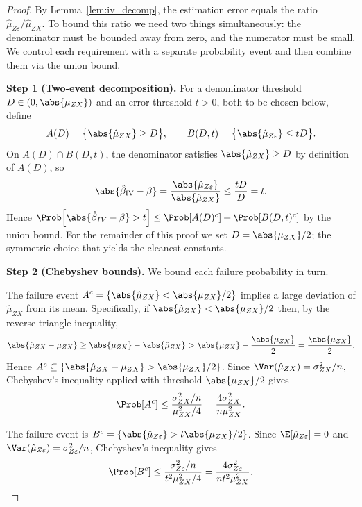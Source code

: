 \begin{proof}
    By Lemma~\ref{lem:iv_decomp}, the estimation error equals the ratio $\hat{\mu}_{Z\varepsilon}/\hat{\mu}_{ZX}$. To bound this ratio we need two things simultaneously: the denominator must be bounded away from zero, and the numerator must be small. We control each requirement with a separate probability event and then combine them via the union bound.

    \medskip\noindent\textbf{Step 1 (Two-event decomposition).}
    For a denominator threshold $D \in (0,\abs{\mu_{ZX}})$ and an error threshold $t > 0$, both to be chosen below, define
    \[
        A(D)   = \bigl\{\abs{\hat{\mu}_{ZX}} \geq D\bigr\},
        \qquad
        B(D,t) = \bigl\{\abs{\hat{\mu}_{Z\varepsilon}} \leq tD\bigr\}.
    \]
    On $A(D)\cap B(D,t)$, the denominator satisfies $\abs{\hat{\mu}_{ZX}}\geq D$ by definition of $A(D)$, so
    \[
        \abs{\hat{\beta}_{\mathrm{IV}} - \beta}= \frac{\abs{\hat{\mu}_{Z \varepsilon}}}{\abs{\hat{\mu}_{ZX}}} \leq \frac{tD}{D} = t.
    \]
    Hence $\Prob\!\left[\abs{\hat\beta_{IV}-\beta}>t\right] \leq \Prob[A(D)^c] + \Prob[B(D,t)^c]$ by the union bound. For the remainder of this proof we set $D = \abs{\mu_{ZX}}/2$; the symmetric choice that yields the cleanest constants.

    \medskip\noindent\textbf{Step 2 (Chebyshev bounds).}
    We bound each failure probability in turn.

    The failure event $A^c = \{\abs{\hat{\mu}_{ZX}} < \abs{\mu_{ZX}}/2\}$ implies a large deviation of $\hat{\mu}_{ZX}$ from its mean. Specifically, if $\abs{\hat{\mu}_{ZX}} < \abs{\mu_{ZX}}/2$ then, by the reverse triangle inequality,
    \[
        \abs{\hat{\mu}_{ZX} - \mu_{ZX}} \geq \abs{\mu_{ZX}} - \abs{\hat{\mu}_{ZX}} > \abs{\mu_{ZX}} - \frac{\abs{\mu_{ZX}}}{2} = \frac{\abs{\mu_{ZX}}}{2}.
    \]
    Hence $A^c \subseteq \{\abs{\hat{\mu}_{ZX}-\mu_{ZX}} > \abs{\mu_{ZX}}/2\}$. Since $\Var(\hat{\mu}_{ZX}) = \sigma_{ZX}^2/n$, Chebyshev's inequality applied with threshold $\abs{\mu_{ZX}}/2$ gives
    \[
        \Prob[A^c] \leq \frac{\sigma_{ZX}^2/n}{\mu_{ZX}^2/4} = \frac{4\sigma_{ZX}^2}{n\mu_{ZX}^2}.
    \]

    The failure event is $B^c = \{\abs{\hat{\mu}_{Z\varepsilon}} > t\abs{\mu_{ZX}}/2\}$. Since $\E[\hat{\mu}_{Z\varepsilon}] = 0$ and $\Var(\hat{\mu}_{Z\varepsilon}) = \sigma_{Z\varepsilon}^2/n$, Chebyshev's inequality gives
    \[
        \Prob[B^c] \leq \frac{\sigma_{Z\varepsilon}^2/n}{t^2\mu_{ZX}^2/4} = \frac{4\sigma_{Z\varepsilon}^2}{nt^2\mu_{ZX}^2}.
    \]


\end{proof}
